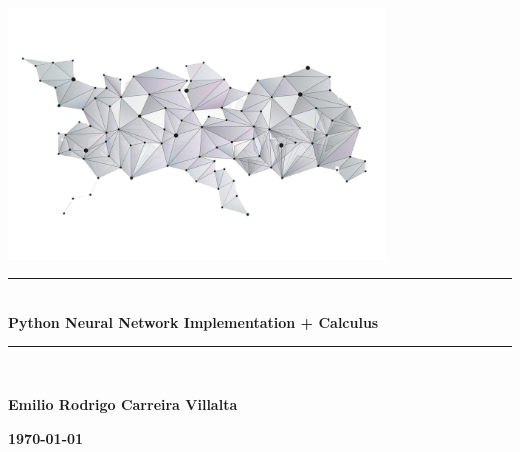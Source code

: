 
\begin{titlepage}

\newcommand{\HRule}{\rule{\linewidth}{0.5mm}} %

\begin{center} 

\includegraphics[width = 10cm]{./figures/red-abstracta}\\[0.5cm] 

\HRule \\[0.3cm]
{ \huge \bfseries Python Neural \vspace{1.5mm} Network Implementation  + Calculus }\\  
\HRule \\[1.5cm]


\end{center}

\begin{center}
     \textbf{Emilio Rodrigo Carreira Villalta}
\end{center}

\vfill

\begin{center}
    \textbf{\today} %
\end{center}

\end{titlepage}

